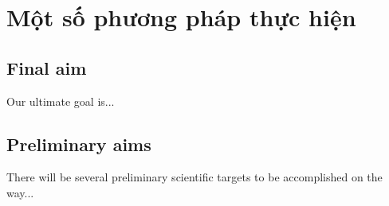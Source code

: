
\chapter{Một số phương pháp thực hiện} %



\section{Final aim}

Our ultimate goal is...

\section{Preliminary aims}

There will be several preliminary scientific targets to be accomplished on the way...




